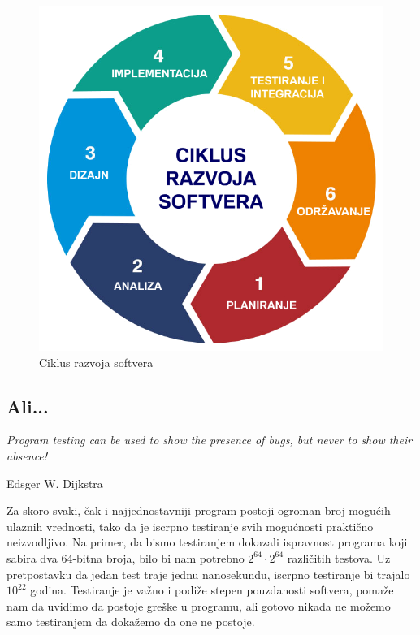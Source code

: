 \documentclass[a4paper]{article}
\begin{document}
\begin{figure}[h!]
\begin{center}
\includegraphics[scale=0.25]{rs.png}
\end{center}
\caption{Ciklus razvoja softvera}
\label{fig:rs}
\end{figure}

\subsection{Ali...}
\label{subsec:ali}
\epigraph{\emph{Program testing can be used to show the presence of bugs, but never to show their absence!}}{Edsger W. Dijkstra}

Za skoro svaki, čak i najjednostavniji program postoji ogroman broj mogućih ulaznih vrednosti, tako da je iscrpno testiranje svih mogućnosti praktično neizvodljivo.
Na primer, da bismo testiranjem dokazali ispravnost programa koji sabira dva 64-bitna broja, bilo bi nam potrebno $2^{64} \cdot 2^{64}$ različitih testova.
Uz pretpostavku da jedan test traje jednu nanosekundu, iscrpno testiranje bi trajalo $10^{22}$ godina.
Testiranje je važno i podiže stepen pouzdanosti softvera, pomaže nam da uvidimo da postoje greške u programu, ali gotovo nikada ne možemo samo testiranjem da dokažemo da one ne postoje.
\end{document}
